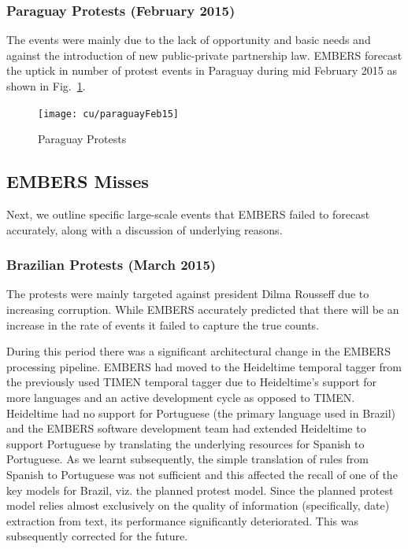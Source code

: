 \subsubsection*{Paraguay Protests (February 2015)}
The events were mainly due to the lack of opportunity and basic
needs and against the introduction of new public-private partnership law.
EMBERS forecast the uptick in number of protest events in Paraguay during mid
February 2015 as shown in Fig.~\ref{fig:paraguay15}.

\begin{figure}[H]
\centering
\texttt{[image: cu/paraguayFeb15]}
\caption{Paraguay Protests }
\label{fig:paraguay15}
\end{figure}

\subsection{EMBERS Misses}
Next, we outline specific large-scale events that
EMBERS failed to forecast accurately, along with a discussion of underlying
reasons.

\subsubsection{Brazilian Protests (March 2015)}
The protests were mainly targeted against president Dilma Rousseff due to
increasing corruption.
While EMBERS accurately predicted that there
will be an increase in the rate of events it failed to
capture the true counts.

During this period there was a significant architectural change in the
EMBERS processing pipeline. EMBERS had moved to the Heideltime temporal
tagger from the previously used TIMEN temporal tagger due to
Heideltime's support for more languages and an active development cycle as
opposed to TIMEN. 
Heideltime had no support for Portuguese (the primary
language used in Brazil) and the EMBERS software development team had extended Heideltime to
support Portuguese by translating the underlying
resources for Spanish to Portuguese. As we learnt subsequently,
the simple translation of rules from Spanish to Portuguese
was not sufficient and this affected the recall of one of the key models
for Brazil, viz. the planned protest model. Since the planned protest model relies
almost exclusively on the quality of information (specifically, date) extraction from text,
its performance significantly deteriorated. This was subsequently corrected for the future.

